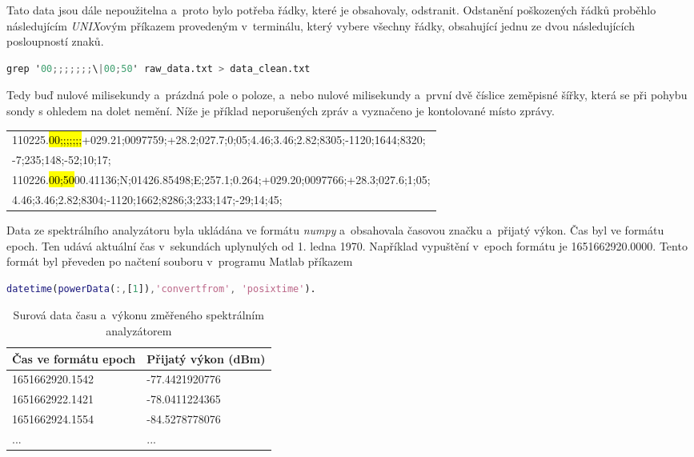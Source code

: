 \documentclass[twoside]{ctuthesis}
\theoremstyle{plain}
\theoremstyle{definition}
\theoremstyle{note}
\begin{document}
	Tato data jsou dále nepoužitelna a~proto bylo potřeba řádky, které je obsahovaly, odstranit. Odstanění poškozených řádků proběhlo následujícím \textit{UNIX}ovým příkazem provedeným v~terminálu, který vybere všechny řádky, obsahující jednu ze dvou následujících posloupností znaků.
	\begin{lstlisting}[language=Awk]
	grep '00;;;;;;;\|00;50' raw_data.txt > data_clean.txt\end{lstlisting}
	Tedy buď nulové milisekundy a~prázdná pole o poloze, a~nebo nulové milisekundy a~první dvě číslice zeměpisné šířky, která se při pohybu sondy s ohledem na dolet nemění. Níže je příklad neporušených zpráv a vyznačeno je kontolované místo zprávy.
	\begin{table}[h!]
		\centering
		\begin{tabular}{l}
			110225.\hl{00;;;;;;;}+029.21;0097759;+28.2;027.7;0;05;4.46;3.46;2.82;8305;-1120;1644;8320;\\
			-7;235;148;-52;10;17;\\\hline
			110226.\hl{00;50}00.41136;N;01426.85498;E;257.1;0.264;+029.20;0097766;+28.3;027.6;1;05;\\
			4.46;3.46;2.82;8304;-1120;1662;8286;3;233;147;-29;14;45;
		\end{tabular}
	\end{table}

	Data ze spektrálního analyzátoru byla ukládána ve formátu \textit{numpy} a~obsahovala časovou značku a~přijatý výkon. Čas byl ve formátu epoch. Ten udává aktuální čas v~sekundách uplynulých od 1. ledna 1970. Například vypuštění v~epoch formátu je 1651662920.0000. Tento formát byl převeden po načtení souboru v~programu Matlab příkazem
	\begin{lstlisting}[language=Matlab]
		datetime(powerData(:,[1]),'convertfrom', 'posixtime').\end{lstlisting}
	\begin{table}
		\centering
		\begin{tabular}{l|l}
			Čas ve formátu epoch &	Přijatý výkon (dBm)\\\hline
			1651662920.1542&       -77.4421920776\\
			1651662922.1421 &      -78.0411224365\\
			1651662924.1554  &     -84.5278778076\\
			...&...
		\end{tabular}
		\caption{Surová data času a~výkonu změřeného spektrálním analyzátorem}
	\end{table}
\end{document}
